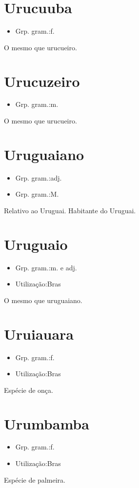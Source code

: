 \documentclass{article}
\begin{document}
\section{Urucuuba}
\begin{itemize}
\item {Grp. gram.:f.}
\end{itemize}
O mesmo que \textunderscore urucueiro\textunderscore .
\section{Urucuzeiro}
\begin{itemize}
\item {Grp. gram.:m.}
\end{itemize}
O mesmo que \textunderscore urucueiro\textunderscore .
\section{Uruguaiano}
\begin{itemize}
\item {Grp. gram.:adj.}
\end{itemize}
\begin{itemize}
\item {Grp. gram.:M.}
\end{itemize}
Relativo ao Uruguai.
Habitante do Uruguai.
\section{Uruguaio}
\begin{itemize}
\item {Grp. gram.:m.  e  adj.}
\end{itemize}
\begin{itemize}
\item {Utilização:Bras}
\end{itemize}
O mesmo que \textunderscore uruguaiano\textunderscore .
\section{Uruiauara}
\begin{itemize}
\item {Grp. gram.:f.}
\end{itemize}
\begin{itemize}
\item {Utilização:Bras}
\end{itemize}
Espécie de onça.
\section{Urumbamba}
\begin{itemize}
\item {Grp. gram.:f.}
\end{itemize}
\begin{itemize}
\item {Utilização:Bras}
\end{itemize}
Espécie de palmeira.
\end{document}
